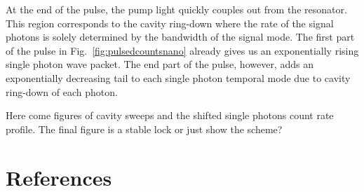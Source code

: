 \documentclass[aps,pra,showpacs,reprint,onecolumn,notitlepage]{revtex4-1}
\begin{document}
At the end of the pulse, the pump light quickly couples out from the resonator. This region corresponds to the cavity ring-down where the rate of the signal photons is solely determined by the bandwidth of the signal mode. The first part of the pulse in Fig.~\ref{fig:pulsedcountsnano} already gives us an exponentially rising single photon wave packet. The end part of the pulse, however, adds an exponentially decreasing tail to each single photon temporal mode due to cavity ring-down of each photon.

Here come figures of cavity sweeps and the shifted single photons count rate profile. The final figure is a stable lock or just show the scheme?

\section{References}
	
	
%	

%
\end{document}
